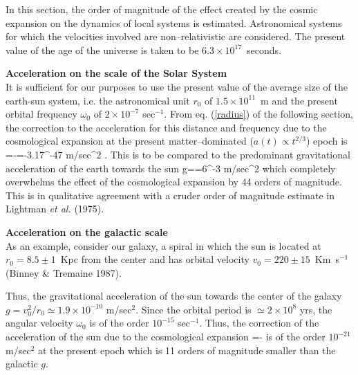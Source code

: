 \setcounter{equation}{0}
  In this section, the order of magnitude of the
  effect created by the cosmic expansion on the dynamics of local systems is
  estimated. Astronomical systems for which the velocities involved are 
  non--relativistic are considered. The 
  present value of the age of the universe is taken to be 
  $6.3\times 10^{17}$~seconds.
  


{\bf Acceleration on the scale of the Solar System}\\
  It is sufficient for our purposes to use the present value of the average
  size of the earth-sun system, i.e. the astronomical unit $r_0$ of $1.5
\times 10^{11}$~m and the present orbital frequency $\omega_0$ of 
$2\times 10^{-7}$ sec$^{-1}$. From eq. (\ref{radius}) of the following
section, the correction to
the acceleration for this distance and frequency due to the cosmological
expansion at the present matter--dominated ($a(t) \propto t^{2/3}$) epoch
is
\be
\delta {}=-=-3.17^{-47}
{\mbox m}/\mbox{sec}^2   \; .
\ee
This is to be compared to the predominant gravitational acceleration of
the earth towards the sun
\be
g==6^{-3} {\mbox m}/\mbox{sec}^2
\ee
which completely overwhelms the effect of the cosmological expansion by 44
orders of magnitude. This is in qualitative agreement with a cruder order
of magnitude estimate in Lightman {\em et al.} (1975).
  
  
  {\bf Acceleration on the galactic scale} \\
  As an example, consider our galaxy, a spiral in which the sun is located at
  $r_0=8.5 \pm 1$~Kpc from the center and has orbital velocity
  $v_0=220 \pm 15$~Km~s$^{-1}$ (Binney \& Tremaine 1987). 
  
  Thus, the gravitational acceleration of the sun towards the center of the
  galaxy $g=v_0^2/r_0 \simeq 1.9\times 10^{-10}$ m/sec$^2$. 
Since the orbital period is
  $\simeq 2\times 10^8$ yrs, the angular velocity $\omega_0$ 
is of the order $10^{-15}$
  sec$^{-1}$. Thus, the correction of the acceleration of the sun due to the
  cosmological expansion
\be
{}=-
\ee
is of the order $10^{-21}$ m/sec$^2$ at the present epoch which is 11
orders of magnitude smaller than the galactic $g$.
  
  
  

